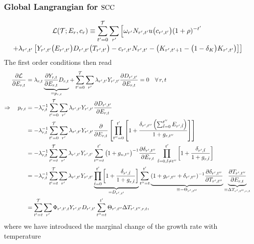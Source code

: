 \documentclass[preprint,3p,authoryear]{elsarticle}
\begin{document}
\subsubsection{Global Langrangian for $\operatorname{SCC}$}
\label{sec:Lglob}
\begin{multline}
  \label{eq:Lglob} \mathcal{L}(\mathcal{T};E_r,c_r)\equiv\sum_{t'=0}^{\mathcal{T}}\sum_{r'}\left[\omega_{r'}N_{r',t'}u\big(c_{r',t'}\big)(1+\rho)^{-t'}\right.\\
  \left.+\lambda_{r',t'}\left[Y_{r',t'}\big(E_{r',t'}\big)D_{r',t'}\big(T_{r',t'}\big) -c_{r',t'}N_{r',t'}-\left(K_{r',t'+1}-\big(1-\delta_K\big)K_{r',t'}\right) \right]\right]
\end{multline}
The first order conditions then read
\begin{align}
  \label{eq:partE}
  \frac{\partial\mathcal{L}}{\partial E_{r,t}} &= \lambda_{r,t}\underbrace{\frac{\partial Y_{r,t}}{\partial E_{r,t}}D_{r,t}}_{=p_{r,t}}+\sum_{t'=0}^{\mathcal{T}}\sum_{r'}\lambda_{r',t'}Y_{r',t'}\frac{\partial D_{r',t'}}{\partial E_{r,t}}=0\quad\forall\,r,t\notag\\
  \Rightarrow \quad p_{r,t} &= -\lambda_{r,t}^{-1}\sum_{t'=0}^{\mathcal{T}}\sum_{r'}\lambda_{r',t'}Y_{r',t'}\frac{\partial D_{r',t'}}{\partial E_{r,t}}\notag\\
                                              &= -\lambda_{r,t}^{-1}\sum_{t'=0}^{\mathcal{T}}\sum_{r'}\lambda_{r',t'}Y_{r',t'}\frac{\partial }{\partial E_{r,t}}\left[\prod_{t''=0}^{t'}\left[1+\frac{\delta_{r',t''}\left(\sum_{\tilde{t}=0}^{t''}E_{r',\tilde{t}}\right)}{1+g_{r,t''}} \right] \right]\notag\\
                                         &=-\lambda_{r,t}^{-1}\sum_{t'=t}^{\mathcal{T}}\sum_{r'}\lambda_{r',t'}Y_{r',t'} \sum_{t''=t}^{t'}\big(1+g_{n,t''}\big)^{-1}\frac{\partial\delta_{r',t''}}{\partial E_{r,t}}\prod_{\tilde{t}=0,\tilde{t}\neq t''}^{t'}\left[1+\frac{\delta_{r',\tilde{t}}}{1+g_{r,\tilde{t}}} \right]\notag\\
                                         &=-\lambda_{r,t}^{-1}\sum_{t'=t}^{\mathcal{T}}\sum_{r'}\lambda_{r',t'}Y_{r',t'}\underbrace{\prod_{\tilde{t}=0}^{t'}\left[1+\frac{\delta_{r',\tilde{t}}}{1+g_{r,\tilde{t}}}\right]}_{=D_{r',t'}}\sum_{t''=t}^{t'}\underbrace{(1+g_{r',t''}+\delta_{r',t''})^{-1}\frac{\partial\delta_{r',t''}}{\partial T_{r',t''}}}_{\equiv -\Theta_{r',t''}}\underbrace{\frac{\partial T_{r',t''}}{\partial E_{r,t}}}_{\equiv\Delta T_{r',t'',r,t}}\notag\\
&= \sum_{t'=t}^{\mathcal{T}}\sum_{r'}\Phi_{r',t',t}Y_{r',t'}D_{r',t'}\sum_{t''=t}^{t'}\Theta_{r',t''}\Delta T_{r',t'',r,t},  
\end{align}
where we have introduced the marginal change of the growth rate with temperature
\end{document}
